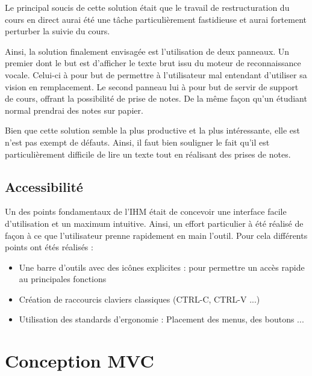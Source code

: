 Le principal soucis de cette solution était que le travail de restructuration du cours en direct aurai été une tâche particulièrement fastidieuse et aurai fortement perturber la suivie du cours.

Ainsi, la solution finalement envisagée est l'utilisation de deux panneaux. Un premier dont le but est d'afficher le texte brut issu du moteur de reconnaissance vocale. Celui-ci à pour but de permettre à l'utilisateur mal entendant d'utiliser sa  vision en remplacement. Le second panneau lui à pour but de servir de support de cours, offrant la possibilité de prise de notes. De la même façon qu'un étudiant normal prendrai des notes sur papier.

Bien que cette solution semble la plus productive et la plus intéressante, elle est n'est pas exempt de défauts. Ainsi, il faut bien souligner le fait qu'il est particulièrement difficile de lire un texte tout en réalisant des  prises de notes.     



\subsection{Accessibilité}

Un des points fondamentaux de l'IHM était de concevoir une interface facile d'utilisation et un maximum intuitive. Ainsi, un effort particulier à été réalisé de façon à ce que l'utilisateur prenne rapidement en main l'outil. Pour cela différents points ont étés réalisés :

\begin{itemize}
 \item Une barre d'outils avec des icônes explicites : pour permettre un accès rapide au principales fonctions
 \item Création de raccourcis claviers classiques (CTRL-C, CTRL-V ...)
 \item Utilisation des standards d'ergonomie : Placement des menus, des boutons ...
\end{itemize}



\section{Conception MVC}


